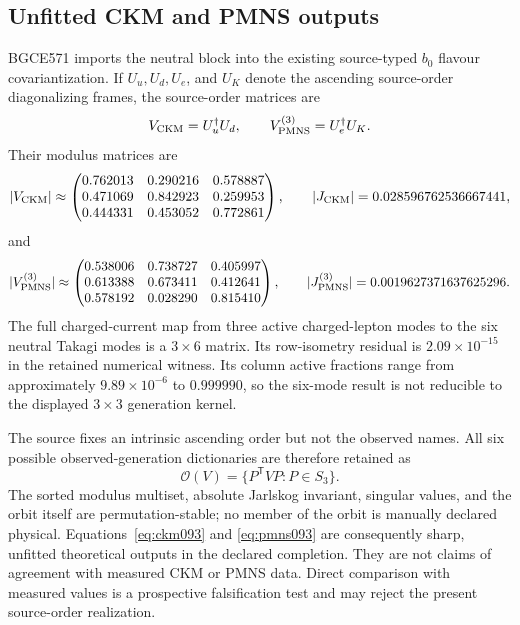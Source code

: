 \documentclass[11pt]{article}
\theoremstyle{definition}
\theoremstyle{remark}
\begin{document}
\subsection{Unfitted CKM and PMNS outputs}

BGCE571 imports the neutral block into the existing source-typed $b_0$ flavour covariantization. If $U_u,U_d,U_e$, and $U_K$ denote the ascending source-order diagonalizing frames, the source-order matrices are
\begin{equation}
 V_{\rm CKM}=U_u^\dagger U_d,
 \qquad
 V_{\rm PMNS}^{(3)}=U_e^\dagger U_K.
\end{equation}
Their modulus matrices are
\begin{equation}
 |V_{\rm CKM}|\approx
 \begin{pmatrix}
 0.762013&0.290216&0.578887\\
 0.471069&0.842923&0.259953\\
 0.444331&0.453052&0.772861
 \end{pmatrix},
 \qquad
 |J_{\rm CKM}|=0.028596762536667441,
 \label{eq:ckm093}
\end{equation}
and
\begin{equation}
 |V_{\rm PMNS}^{(3)}|\approx
 \begin{pmatrix}
 0.538006&0.738727&0.405997\\
 0.613388&0.673411&0.412641\\
 0.578192&0.028290&0.815410
 \end{pmatrix},
 \qquad
 |J_{\rm PMNS}^{(3)}|=0.0019627371637625296.
 \label{eq:pmns093}
\end{equation}
The full charged-current map from three active charged-lepton modes to the six neutral Takagi modes is a $3\times6$ matrix. Its row-isometry residual is $2.09\times10^{-15}$ in the retained numerical witness. Its column active fractions range from approximately $9.89\times10^{-6}$ to $0.999990$, so the six-mode result is not reducible to the displayed $3\times3$ generation kernel.

The source fixes an intrinsic ascending order but not the observed names. All six possible observed-generation dictionaries are therefore retained as
\begin{equation}
 \mathcal O(V)=\{P^{\mathsf T}VP:P\in S_3\}.
 \label{eq:flavourorbit093}
\end{equation}
The sorted modulus multiset, absolute Jarlskog invariant, singular values, and the orbit itself are permutation-stable; no member of the orbit is manually declared physical. Equations~\eqref{eq:ckm093} and \eqref{eq:pmns093} are consequently sharp, unfitted theoretical outputs in the declared completion. They are not claims of agreement with measured CKM or PMNS data. Direct comparison with measured values is a prospective falsification test and may reject the present source-order realization.
\end{document}
